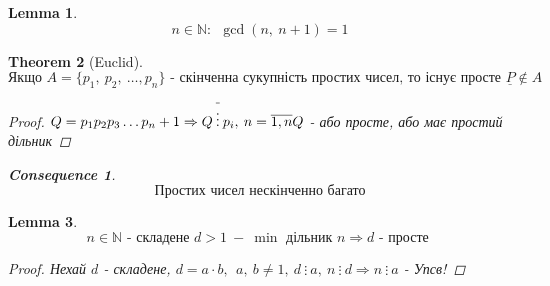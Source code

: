 \documentclass[a4paper,12pt, centered]{bookest}
\newtheorem{theorem}{Theorem}[section]
\newtheorem{lemma}[theorem]{Lemma}
\newtheorem*{cons*}{Consequence}
\begin{document}
\begin{lemma}
	$$n\in\mathbb{N}:\>\>\gcd(n,\>n+1)=1$$
\end{lemma}
\begin{theorem}[Euclid]
	$$\textrm{Якщо }A=\{p_1,\>p_2,\>\dots,p_n\}\textrm{ - скінченна сукупність простих чисел, то існує просте } \underline{P}\notin A$$
	\begin{proof}
		$\\Q=p_1p_2p_3\dots p_n+1\Rightarrow Q\>\overline{\vdots }\>p_i,\>n=\overline{1,n}\\ Q$ - або просте, або має простий дільник
	\end{proof}
	\begin{cons*}
		$$\textrm{Простих чисел нескінченно багато}$$
	\end{cons*}
\end{theorem}
\begin{lemma}
	$$n\in\mathbb{N} \textrm{ - складене } d>1\> -\>\min\textrm{ дільник } n\Rightarrow d\textrm{ - просте	}$$
	\begin{proof}
		$ $Нехай $d$ - складене, $d=a\cdot b,\>\>a,\>b\neq 1,\>d\>\vdots\>a,\>n\>\vdots\>d\Rightarrow n\>\vdots\>a$ - Упсв! 
	\end{proof}
\end{lemma}
\end{document}
